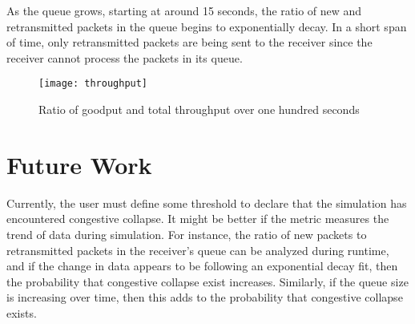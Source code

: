 \documentclass{article}
\begin{document}
As the queue grows, starting at around 15 seconds, the ratio of new and retransmitted packets in the queue begins to exponentially decay. In a short span of time, only retransmitted packets are being sent to the receiver since the receiver cannot process the packets in its queue.

\begin{figure}[H]
	\texttt{[image: throughput]}
	\centering
	\caption{Ratio of goodput and total throughput over one hundred seconds}
\end{figure}

\section{Future Work}
Currently, the user must define some threshold to declare that the simulation has encountered congestive collapse. It might be better if the metric measures the trend of data during simulation. For instance, the ratio of new packets to retransmitted packets in the receiver's queue can be analyzed during runtime, and if the change in data appears to be following an exponential decay fit, then the probability that congestive collapse exist increases. Similarly, if the queue size is increasing over time, then this adds to the probability that congestive collapse exists.
\end{document}
